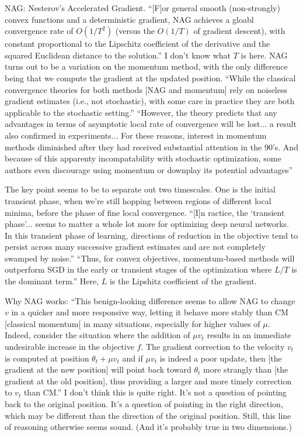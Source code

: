 \documentclass[12pt]{report}
\begin{document}
NAG: Nesterov's Accelerated Gradient.  ``[F]or general smooth
(non-strongly) convex functions and a deterministic gradient, NAG
achieves a gloabl convergence rate of $O(1/T^2)$ (versus the $O(1/T)$
of gradient descent), with constant proportional to the Lipschitz
coefficient of the derivative and the squared Euclidean distance to
the solution.''  I don't know what $T$ is here.  NAG turns out to be a
variation on the momentum method, with the only difference being that
we compute the gradient at the updated position.  ``While the
classical convergence theories for both methods [NAG and momentum]
rely on noiseless gradient estimates (i.e., not stochastic), with some
care in practice they are both applicable to the stochastic setting.''
``However, the theory predicts that any advantages in terms of
asymptotic local rate of convergence will be lost... a result also
confirmed in experiments... For these reasons, interest in momentum
methods diminished after they had received substantial attention in
the 90's.  And because of this apparenty incompatability with
stochastic optimization, some authors even discourage using momentum
or downplay its potential advantages''

The key point seems to be to separate out two timescales.  One is the
initial transient phase, when we're still hopping between regions of
different local minima, before the phase of fine local convergence.
``[I]n ractice, the `transient phase'... seems to matter a whole lot
more for optimizing deep neural networks.  In this transient phase of
learning, directions of reduction in the objective tend to persist
across many successive gradient estimates and are not completely
swamped by noise.''  ``Thus, for convex objectives, momentum-based
methods will outperform SGD in the early or transient stages of the
optimization where $L/T$ is the dominant term.''  Here, $L$ is the
Lipshitz coefficient of the gradient.

Why NAG works: ``This benign-looking difference seems to allow NAG to
change $v$ in a quicker and more responsive way, letting it behave
more stably than CM [classical momentum[ in many situations,
especially for higher values of $\mu$.  Indeed, consider the situation
where the addition of $\mu v_t$ results in an immediate undesirable
increase in the objective $f$.  The gradient correction to the
velocity $v_t$ is computed at position $\theta_t + \mu v_t$ and if
$\mu v_t$ is indeed a poor update, then [the gradient at the new
position] will point back toward $\theta_t$ more strangly than [the
gradient at the old position], thus providing a larger and more timely
correction to $v_t$ than CM.''  I don't think this is quite right.
It's not a question of pointing back to the original position.  It's a
question of pointing in the right direction, which may be different
than the direction of the original position. Still, this line of
reasoning otherwise seems sound.  (And it's probably true in two
dimensions.)
\end{document}
